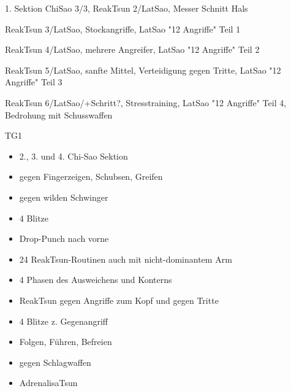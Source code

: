 \begin{WTGradSG}{8}

1. Sektion ChiSao 3/3, ReakTsun 2/LatSao, Messer Schnitt Hals

\end{WTGradSG}
\begin{WTGradSG}{9}

ReakTsun 3/LatSao, Stockangriffe, LatSao "12 Angriffe" Teil 1

\end{WTGradSG}
\begin{WTGradSG}{10}

ReakTsun 4/LatSao, mehrere Angreifer, LatSao "12 Angriffe" Teil 2

\end{WTGradSG}
\begin{WTGradSG}{11}

ReakTsun 5/LatSao, sanfte Mittel, Verteidigung gegen Tritte, LatSao "12 Angriffe" Teil 3

\end{WTGradSG}
\begin{WTGradSG}{12}

ReakTsun 6/LatSao/+Schritt?, Stresstraining, LatSao "12 Angriffe" Teil 4, Bedrohung mit Schusswaffen

\end{WTGradSG}




\begin{WTGradTG}{1}{TG1}

\begin{itemize}
	\item 2., 3. und 4. Chi-Sao Sektion
	\item gegen Fingerzeigen, Schubsen, Greifen
	\item gegen wilden Schwinger
	\item 4 Blitze
	\item Drop-Punch nach vorne
	\item 24 ReakTsun-Routinen auch mit nicht-dominantem Arm
	\item 4 Phasen des Ausweichens und Konterns
	\item ReakTsun gegen Angriffe zum Kopf und gegen Tritte
	\item 4 Blitze z. Gegenangriff
	\item Folgen, F\"uhren, Befreien
	\item gegen Schlagwaffen
	\item AdrenalisaTsun
\end{itemize}

\end{WTGradTG}

